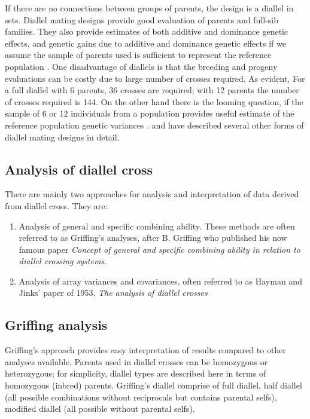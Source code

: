 \documentclass[nofonts,]{tufte-handout}
\begin{document}
If there are no connections between groups of parents, the design is a
diallel in sets. Diallel mating designs provide good evaluation of
parents and full-sib families. They also provide estimates of both
additive and dominance genetic effects, and genetic gains due to
additive and dominance genetic effects if we assume the sample of
parents used is sufficient to represent the reference population
\citep{baker1978issues, holland2003estimating}. One disadvantage of
diallels is that the breeding and progeny evaluations can be costly due
to large number of crosses required. As evident, For a full diallel with
6 parents, 36 crosses are required; with 12 parents the number of
crosses required is 144. On the other hand there is the looming
question, if the sample of 6 or 12 individuals from a population
provides useful estimate of the reference population genetic variances
\citep{baker1978issues}. \citet{white2007forest} and
\citet{hallauer1988quantitative} have described several other forms of
diallel mating designs in detail.

\hypertarget{analysis-of-diallel-cross}{%
\subsection{Analysis of diallel cross}\label{analysis-of-diallel-cross}}

There are mainly two approaches for analysis and interpretation of data
derived from diallel cross. They are:

\begin{enumerate}
\def\labelenumi{\arabic{enumi}.}
\item
  Analysis of general and specific combining ability. These methods are
  often referred to as Griffing's analyses, after B. Griffing who
  published his now famous paper \emph{Concept of general and specific
  combining ability in relation to diallel crossing systems}.
\item
  Analysis of array variances and covariances, often referred to as
  Hayman and Jinks' paper of 1953, \emph{The analysis of diallel
  crosses}
\end{enumerate}

\hypertarget{griffing-analysis}{%
\subsection{Griffing analysis}\label{griffing-analysis}}

Griffing's approach provides easy interpretation of results compared to
other analyses available. Parents used in diallel crosses can be
homozygous or heterozygous; for simplicity, diallel types are described
here in terms of homozygous (inbred) parents. Griffing's diallel
comprise of full diallel, half diallel (all possible combinations
without reciprocals but contains parental selfs), modified diallel (all
possible without parental selfs).
\end{document}
